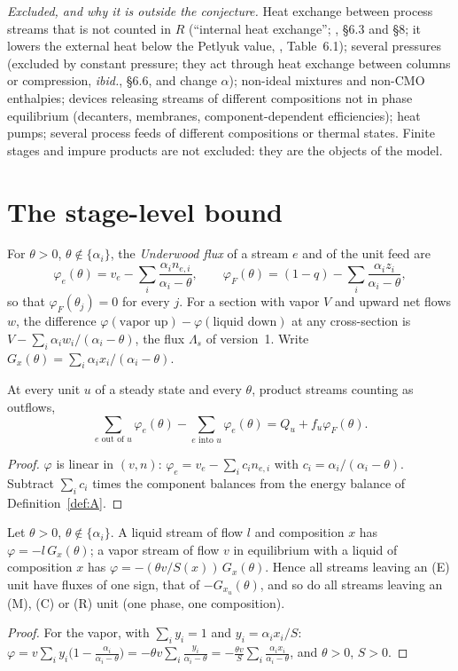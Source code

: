 \emph{Excluded, and why it is outside the conjecture.} Heat exchange between process streams that is not counted in $R$
(``internal heat exchange''; \autocite{HS3}, \S6.3 and \S8; it lowers the external heat below the Petlyuk value,
\autocite{HalvorsenThesis}, Table~6.1); several pressures (excluded by constant pressure; they act through heat
exchange between columns or compression, \emph{ibid.}, \S6.6, and change $\alpha$); non-ideal mixtures and non-CMO
enthalpies; devices releasing streams of different compositions not in phase equilibrium (decanters, membranes,
component-dependent efficiencies); heat pumps; several process feeds of different compositions or thermal states.
Finite stages and impure products are not excluded: they are the objects of the model.

\section{The stage-level bound}\label{sec:stage}

For $\theta>0$, $\theta\notin\{\alpha_i\}$, the \emph{Underwood flux} of a stream $e$ and of the unit feed are
\[\varphi_e(\theta)=v_e-\sum_i\frac{\alpha_in_{e,i}}{\alpha_i-\theta},\qquad\varphi_F(\theta)=(1-q)-\sum_i\frac{\alpha_iz_i}{\alpha_i-\theta},\]
so that $\varphi_F(\theta_j)=0$ for every $j$. For a section with vapor $V$ and upward net flows $w$, the difference
$\varphi(\text{vapor up})-\varphi(\text{liquid down})$ at any cross-section is $V-\sum_i\alpha_iw_i/(\alpha_i-\theta)$, the
flux $\Lambda_s$ of version~1. Write $G_x(\theta)=\sum_i\alpha_ix_i/(\alpha_i-\theta)$.

\begin{lemma}\label{lem:node}
At every unit $u$ of a steady state and every $\theta$, product streams counting as outflows,
\[\sum_{e\text{ out of }u}\varphi_e(\theta)-\sum_{e\text{ into }u}\varphi_e(\theta)=Q_u+f_u\varphi_F(\theta).\]
\end{lemma}
\begin{proof}
$\varphi$ is linear in $(v,n)$: $\varphi_e=v_e-\sum_ic_in_{e,i}$ with $c_i=\alpha_i/(\alpha_i-\theta)$. Subtract $\sum_ic_i$ times
the component balances from the energy balance of Definition~\ref{def:A}.
\end{proof}

\begin{lemma}\label{lem:uniform}
Let $\theta>0$, $\theta\notin\{\alpha_i\}$. A liquid stream of flow $l$ and composition $x$ has $\varphi=-l\,G_x(\theta)$; a vapor
stream of flow $v$ in equilibrium with a liquid of composition $x$ has $\varphi=-(\theta v/S(x))\,G_x(\theta)$. Hence all
streams leaving an (E) unit have fluxes of one sign, that of $-G_{x_u}(\theta)$, and so do all streams leaving an (M), (C) or
(R) unit (one phase, one composition).
\end{lemma}
\begin{proof}
For the vapor, with $\sum_iy_i=1$ and $y_i=\alpha_ix_i/S$: $\varphi=v\sum_iy_i\bigl(1-\frac{\alpha_i}{\alpha_i-\theta}\bigr)
=-\theta v\sum_i\frac{y_i}{\alpha_i-\theta}=-\frac{\theta v}{S}\sum_i\frac{\alpha_ix_i}{\alpha_i-\theta}$, and $\theta>0$, $S>0$.
\end{proof}

